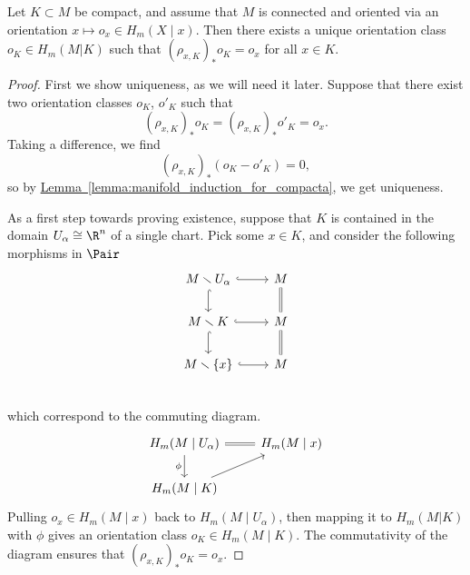 \documentclass[main.tex]{subfiles}
\begin{document}
\begin{proposition}
  \label{prop:orientation_class_for_compacta}
  Let \(K \subset M\) be compact, and assume that \(M\) is connected and oriented via an orientation \(x \mapsto o_{x} \in H_{m}(X \mid x)\). Then there exists a unique orientation class \(o_{K} \in H_{m}(M | K)\) such that \((\rho_{x, K})_{*}o_{K} = o_{x}\) for all \(x \in K\).
\end{proposition}
\begin{proof}
  First we show uniqueness, as we will need it later. Suppose that there exist two orientation classes \(o_{K}\), \(o'_{K}\) such that
  \begin{equation*}
    (\rho_{x, K})_{*}o_{K} = (\rho_{x, K})_{*}o'_{K} = o_{x}.
  \end{equation*}
  Taking a difference, we find
  \begin{equation*}
    (\rho_{x, K})_{*}(o_{K} - o'_{K}) = 0,
  \end{equation*}
  so by \hyperref[lemma:manifold_induction_for_compacta]{Lemma~\ref*{lemma:manifold_induction_for_compacta}}, we get uniqueness.

  As a first step towards proving existence, suppose that \(K\) is contained in the domain \(U_{\alpha} \cong \R^{n}\) of a single chart. Pick some \(x \in K\), and consider the following morphisms in \(\Pair\)
  \begin{equation*}
    \begin{tikzcd}
      M \smallsetminus U_{\alpha}
      \arrow[r, hook]
      \arrow[d, hook]
      & M
      \arrow[d, equals]
      \\
      M \smallsetminus K
      \arrow[r, hook]
      \arrow[d, hook]
      & M
      \arrow[d, equals]
      \\
      M \smallsetminus \{x\}
      \arrow[r, hook]
      & M
      \\
    \end{tikzcd}
  \end{equation*}
  which correspond to the commuting diagram.
  \begin{equation*}
    \begin{tikzcd}
      H_{m}(M \mid U_{\alpha})
      \arrow[r, equals]
      \arrow[d, swap, "\phi"]
      & H_{m}(M \mid x)
      \\
      H_{m}(M \mid K)
      \arrow[ur]
    \end{tikzcd}
  \end{equation*}
  Pulling \(o_{x} \in H_{m}(M \mid x)\) back to \(H_{m}(M \mid U_{\alpha})\), then mapping it to \(H_{m}(M | K)\) with \(\phi\) gives an orientation class \(o_{K} \in H_{m}(M \mid K)\). The commutativity of the diagram ensures that \((\rho_{x, K})_{*}o_{K} = o_{x}\).


\end{proof}
\end{document}
